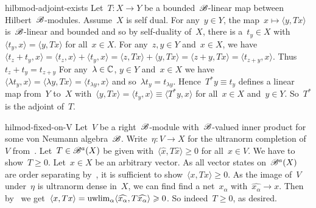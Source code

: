 \begin{solution}{hilbmod-adjoint-exists}%
Let~$T\colon X\to Y$ be a bounded~$\mathscr{B}$-linear map between Hilbert~$\mathscr{B}$-modules.
Assume~$X$ is self dual.
For any~$y \in Y$, the map~$x \mapsto \langle y, Tx\rangle$
    is~$\mathscr{B}$-linear and bounded
    and so by self-duality of~$X$,
    there is a~$t_y \in X$
    with~$\langle t_y, x \rangle = \langle y, Tx\rangle$
    for all~$x \in X$.
For any~$z,y \in Y$ and~$x \in X$,
        we have~$\langle t_z + t_y, x\rangle
            = \langle t_z, x\rangle + \langle t_y, x\rangle
            = \langle z, Tx\rangle + \langle y, Tx \rangle
            = \langle z + y, Tx \rangle
            = \langle t_{z+y}, x\rangle$.
        Thus~$t_z + t_y = t_{z+y}$
For any~$\lambda \in \mathbb{C}$, $y \in Y$ and~$x \in X$
    we have~$\langle \lambda t_y, x \rangle
        =  \langle \lambda y, T x\rangle
        = \langle t_{\lambda y}, x \rangle$
        and so~$\lambda t_y = t_{\lambda y}$.
Hence~$T^* y \equiv t_y$ defines a linear map from~$Y$ to~$X$
    with~$\langle y, Tx\rangle = \langle t_y, x\rangle
    \equiv \langle T^*y, x \rangle$ for all~$x\in X$ and~$y \in Y$.
So~$T^*$ is the adjoint of~$T$.
\end{solution}
\begin{solution}{hilmod-fixed-on-V}%
    Let~$V$ be a right~$\mathscr{B}$-module with~$\mathscr{B}$-valued inner product
        for some von Neumann algebra~$\mathscr{B}$.
    Write~$\eta\colon V \to X$ for the ultranorm completion of~$V$
        from~.
    Let~$T \in \mathscr{B}^a(X)$ be given
        with~$\langle \hat{x}, T \hat{x} \rangle \geq 0$
        for all~$x \in V$.
    We have to show~$T \geq 0$.
    Let~$x \in X$ be an arbitrary vector.
    As all vector states on~$\mathscr{B}^a(X)$ are order separating
        by~,
        it is sufficient to show~$\langle x, Tx \rangle \geq 0$.
As the image of~$V$ under~$\eta$ is ultranorm dense in~$X$,
    we can find find a net~$x_\alpha$ with~$\widehat{x_\alpha} \to x$.
Then by~
    we get~$\langle x, Tx\rangle = \uwlim_\alpha \langle \widehat{x_\alpha},
            T\widehat{x_\alpha}\rangle \geq 0$.
            So indeed~$T \geq 0$, as desired.
\end{solution}
